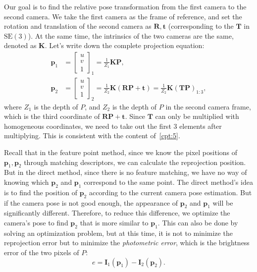 Our goal is to find the relative pose transformation from the first camera to the second camera. We take the first camera as the frame of reference, and set the rotation and translation of the second camera as $\mathbf{R}, \mathbf{t}$ (corresponding to the $\mathbf{T}$ in $\mathrm{SE}(3)$). At the same time, the intrinsics of the two cameras are the same, denoted as $\mathbf{K}$. Let's write down the complete projection equation:
\begin{align*}
{\mathbf{p}_1} &= {\left[ \begin{array}{l}
	u\\
	v\\
	1
	\end{array} \right]_1} = \frac{1}{Z_1} \mathbf{KP}, \\
{\mathbf{p}_2} &= {\left[ \begin{array}{l}
	u\\
	v\\
	1
	\end{array} \right]_2} = \frac{1}{Z_2} \mathbf{K}\left( {\mathbf{RP} +\mathbf{t}} \right) = \frac{1}{Z_2} \mathbf{K} \left(\mathbf{T}  \mathbf{P} \right)_{1:3},
\end{align*}
where $Z_1$ is the depth of $P$, and $Z_2$ is the depth of $P$ in the second camera frame, which is the third coordinate of $\mathbf{RP}+\mathbf{t}$. Since $\mathbf{T}$ can only be multiplied with homogeneous coordinates, we need to take out the first 3 elements after multiplying. This is consistent with the content of~\ref{cpt:5}.

Recall that in the feature point method, since we know the pixel positions of $\mathbf{p}_1, \mathbf{p}_2$ through matching descriptors, we can calculate the reprojection position. But in the direct method, since there is no feature matching, we have no way of knowing which $\mathbf{p}_2$ and $\mathbf{p}_1$ correspond to the same point. The direct method's idea is to find the position of $\mathbf{p}_2$ according to the current camera pose estimation. But if the camera pose is not good enough, the appearance of $\mathbf{p}_2$ and $\mathbf{p}_1$ will be significantly different. Therefore, to reduce this difference, we optimize the camera's pose to find $\mathbf{p}_2$ that is more similar to $\mathbf{p}_1$. This can also be done by solving an optimization problem, but at this time, it is not to minimize the reprojection error but to minimize the \textit{photometric error}, which is the brightness error of the two pixels of $P$:
\begin{equation}
e = {\mathbf{I}_1}\left( {{\mathbf{p}_1}} \right) - {\mathbf{I}_2}\left( {{\mathbf{p}_2}} \right).
\end{equation}

